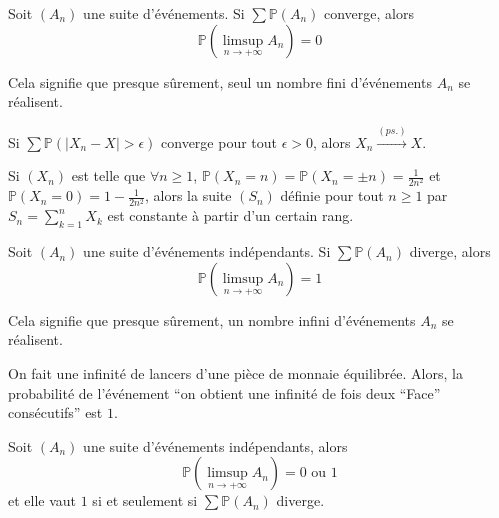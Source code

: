
	\begin{theorem}
		Soit $(A_n)$ une suite d'événements. Si $\sum \mathbb{P}(A_n)$ converge, alors
		\[ \mathbb{P} \left( \limsup_{n \rightarrow +\infty} A_n \right) = 0 \]
	\end{theorem}

	\begin{remark}
		Cela signifie que presque sûrement, seul un nombre fini d'événements $A_n$ se réalisent.
	\end{remark}

	\begin{corollary}
		Si $\sum \mathbb{P}(\vert X_n - X \vert > \epsilon)$ converge pour tout $\epsilon > 0$, alors $X_n \overset{(ps.)}{\longrightarrow} X$.
	\end{corollary}


	\begin{example}
		Si $(X_n)$ est telle que $\forall n \geq 1$, $\mathbb{P}(X_n = n) = \mathbb{P}(X_n = \pm n) = \frac{1}{2n^2}$ et $\mathbb{P}(X_n = 0) = 1 - \frac{1}{2n^2}$, alors la suite $(S_n)$ définie pour tout $n \geq 1$ par $S_n = \sum_{k=1}^n X_k$ est constante à partir d'un certain rang.
	\end{example}


	\begin{theorem}
		Soit $(A_n)$ une suite d'événements indépendants. Si $\sum \mathbb{P}(A_n)$ diverge, alors
		\[ \mathbb{P} \left( \limsup_{n \rightarrow +\infty} A_n \right) = 1 \]
	\end{theorem}

	\begin{remark}
		Cela signifie que presque sûrement, un nombre infini d'événements $A_n$ se réalisent.
	\end{remark}


	\begin{example}
		On fait une infinité de lancers d'une pièce de monnaie équilibrée. Alors, la probabilité de l'événement ``on obtient une infinité de fois deux ``Face'' consécutifs'' est $1$.
	\end{example}

	\begin{corollary}
		Soit $(A_n)$ une suite d'événements indépendants, alors
		\[ \mathbb{P} \left( \limsup_{n \rightarrow +\infty} A_n \right) = 0 \text{ ou } 1 \]
		et elle vaut $1$ si et seulement si $\sum \mathbb{P}(A_n)$ diverge.
	\end{corollary}

